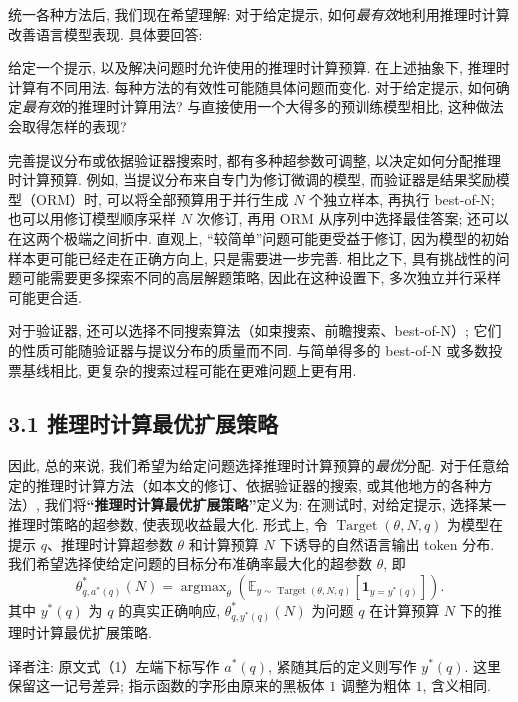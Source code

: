 统一各种方法后, 我们现在希望理解: 对于给定提示, 如何\emph{最有效}地利用推理时计算改善语言模型表现. 具体要回答: 
\begin{remark}[问题设置]
给定一个提示, 以及解决问题时允许使用的推理时计算预算. 在上述抽象下, 推理时计算有不同用法. 每种方法的有效性可能随具体问题而变化. 对于给定提示, 如何确定\emph{最有效}的推理时计算用法? 与直接使用一个大得多的预训练模型相比, 这种做法会取得怎样的表现? 
\end{remark}
完善提议分布或依据验证器搜索时, 都有多种超参数可调整, 以决定如何分配推理时计算预算. 例如, 当提议分布来自专门为修订微调的模型, 而验证器是结果奖励模型（ORM）时, 可以将全部预算用于并行生成 $N$ 个独立样本, 再执行 best-of-N; 也可以用修订模型顺序采样 $N$ 次修订, 再用 ORM 从序列中选择最佳答案; 还可以在这两个极端之间折中. 直观上, “较简单”问题可能更受益于修订, 因为模型的初始样本更可能已经走在正确方向上, 只是需要进一步完善. 相比之下, 具有挑战性的问题可能需要更多探索不同的高层解题策略, 因此在这种设置下, 多次独立并行采样可能更合适. 

对于验证器, 还可以选择不同搜索算法（如束搜索、前瞻搜索、best-of-N）; 它们的性质可能随验证器与提议分布的质量而不同. 与简单得多的 best-of-N 或多数投票基线相比, 更复杂的搜索过程可能在更难问题上更有用. 

\subsection*{3.1 推理时计算最优扩展策略}
因此, 总的来说, 我们希望为给定问题选择推理时计算预算的\emph{最优}分配. 对于任意给定的推理时计算方法（如本文的修订、依据验证器的搜索, 或其他地方的各种方法）, 我们将\textbf{“推理时计算最优扩展策略”}定义为: 在测试时, 对给定提示, 选择某一推理时策略的超参数, 使表现收益最大化. 形式上, 令 $\operatorname{Target}(\theta,N,q)$ 为模型在提示 $q$、推理时计算超参数 $\theta$ 和计算预算 $N$ 下诱导的自然语言输出 token 分布. 我们希望选择使给定问题的目标分布准确率最大化的超参数 $\theta$, 即
\begin{equation}
\theta^{*}_{q,a^*(q)}(N)=\operatorname{argmax}_{\theta}
\left(\mathbb E_{y\sim\operatorname{Target}(\theta,N,q)}
\left[\mathbf 1_{y=y^*(q)}\right]\right).
\label{testcompute-eq:test_time_compute_optimal}
\end{equation}
其中 $y^*(q)$ 为 $q$ 的真实正确响应, $\theta^{*}_{q,y^*(q)}(N)$ 为问题 $q$ 在计算预算 $N$ 下的推理时计算最优扩展策略. 
\begin{remark}
译者注: 原文式（1）左端下标写作 $a^*(q)$, 紧随其后的定义则写作 $y^*(q)$. 这里保留这一记号差异; 指示函数的字形由原来的黑板体 $1$ 调整为粗体 $1$, 含义相同. 
\end{remark}


